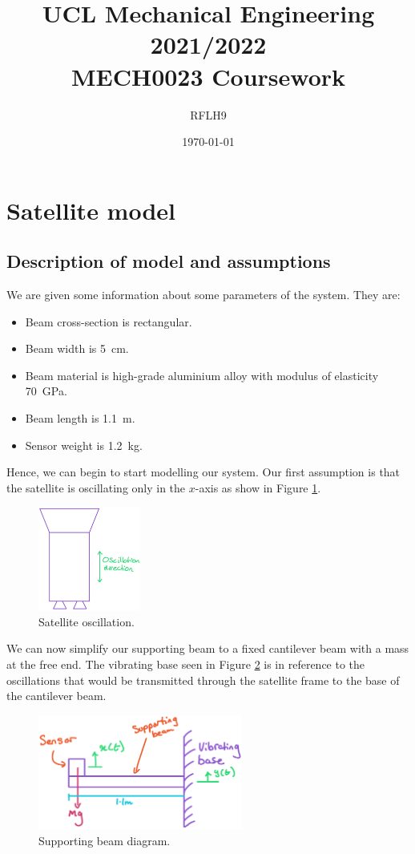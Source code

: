 \documentclass[11pt]{article}
\numberwithin{equation}{section}
\begin{document}
\title{\textbf{UCL Mechanical Engineering 2021/2022}\\MECH0023 Coursework}
\author{RFLH9}
\date{\today}
\maketitle
\tableofcontents
\listoffigures
\section{Satellite model}
\subsection{Description of model and assumptions}
We are given some information about some parameters of the system. They are:
\begin{itemize}
    \item Beam cross-section is rectangular.
    \item Beam width is \SI{5}{\centi\meter}.
    \item Beam material is high-grade aluminium alloy with modulus of elasticity \SI{70}{\giga\pascal}.
    \item Beam length is \SI{1.1}{\meter}.
    \item Sensor weight is \SI{1.2}{\kilo\gram}.
\end{itemize}
Hence, we can begin to start modelling our system. Our first assumption is that the satellite is oscillating only in the $x$-axis as show in Figure \ref{q1a}.
\begin{figure}[H]
    \centering
    \includegraphics[width = 0.3\textwidth]{./img/q1a.png}
    \caption{Satellite oscillation.}
    \label{q1a}
\end{figure}
We can now simplify our supporting beam to a fixed cantilever beam with a mass at the free end. The vibrating base seen in Figure \ref{q1a2} is in reference to the oscillations that would be transmitted through the satellite frame to the base of the cantilever beam.
\begin{figure}[H]
    \centering
    \includegraphics[width = 0.6\textwidth]{./img/q1a2.png}
    \caption{Supporting beam diagram.}
    \label{q1a2}
\end{figure}
\end{document}
